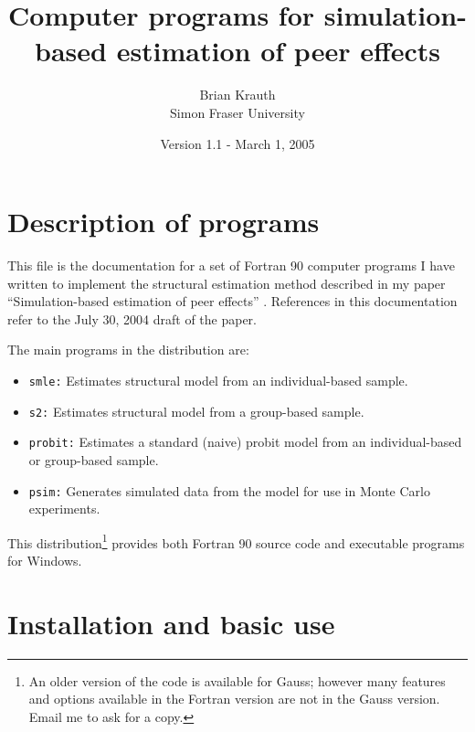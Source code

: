 \documentclass{article}
\begin{document}
\title{Computer programs for simulation-based estimation of peer effects}
\author{Brian Krauth \\
	Simon Fraser University}
\date{Version 1.1 - March 1, 2005}
	
\maketitle

\section{Description of programs}

This file is the documentation for a set of Fortran 90 computer programs
I have written to implement the structural estimation method
described in my paper ``Simulation-based estimation of peer effects'' \cite{smle}.
References in this documentation refer to the July 30, 2004 draft of the paper.  

The main programs in the distribution are:
\begin{itemize}
\item {\tt smle:} Estimates structural model from an individual-based sample.
\item {\tt s2:} Estimates structural model from a group-based sample.
\item {\tt probit:} Estimates a standard (naive) probit model from an individual-based or group-based
	sample.
\item {\tt psim:} Generates simulated data from the model for use in Monte Carlo experiments.
\end{itemize}
This distribution\footnote{An older version of the code is available for Gauss; however many features and options
available in the Fortran version are not in the Gauss version.  Email me to ask for 
a copy.} provides both Fortran 90 source code and executable programs for Windows.

\section{Installation and basic use}
\end{document}
